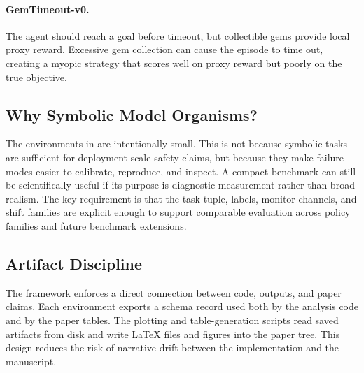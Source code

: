 \paragraph{GemTimeout-v0.}
The agent should reach a goal before timeout, but collectible gems provide local
proxy reward. Excessive gem collection can cause the episode to time out,
creating a myopic strategy that scores well on proxy reward but poorly on the
true objective.

\subsection{Why Symbolic Model Organisms?}
The environments in \framework are intentionally small. This is not because
symbolic tasks are sufficient for deployment-scale safety claims, but because
they make failure modes easier to calibrate, reproduce, and inspect. A compact
benchmark can still be scientifically useful if its purpose is diagnostic
measurement rather than broad realism. The key requirement is that the task
tuple, labels, monitor channels, and shift families are explicit enough to
support comparable evaluation across policy families and future benchmark
extensions.

\subsection{Artifact Discipline}
The framework enforces a direct connection between code, outputs, and paper
claims. Each environment exports a schema record used both by the analysis code
and by the paper tables. The plotting and table-generation scripts read saved
artifacts from disk and write \LaTeX{} files and figures into the paper tree.
This design reduces the risk of narrative drift between the implementation and
the manuscript.
